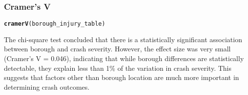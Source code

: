 \documentclass[10pt]{article}\usepackage[]{graphicx}\usepackage[]{xcolor}
\makeatletter
\newcommand{\hldef}[1]{\textcolor[rgb]{0.345,0.345,0.345}{#1}}%
\newcommand{\hlkwd}[1]{\textcolor[rgb]{0.737,0.353,0.396}{\textbf{#1}}}%
\newenvironment{kframe}{%
 \def\at@end@of@kframe{}%
 \ifinner\ifhmode%
  \def\at@end@of@kframe{\end{minipage}}%
  \begin{minipage}{\columnwidth}%
 \fi\fi%
 \def\FrameCommand##1{\hskip\@totalleftmargin \hskip-\fboxsep
 \colorbox{shadecolor}{##1}\hskip-\fboxsep
     \hskip-\linewidth \hskip-\@totalleftmargin \hskip\columnwidth}%
 \MakeFramed {\advance\hsize-\width
   \@totalleftmargin\z@ \linewidth\hsize
   \@setminipage}}%
 {\par\unskip\endMakeFramed%
 \at@end@of@kframe}
\newenvironment{knitrout}{}{} %
\makeatother
\begin{document}
\subsubsection{Cramer’s V}



\begin{knitrout}
\color{fgcolor}\begin{kframe}
\begin{alltt}
\hlkwd{cramerV}\hldef{(borough_injury_table)}
\end{alltt}


{\ttfamily\noindent\bfseries\color{errorcolor}{\#\# Error: object 'borough\_injury\_table' not found}}\end{kframe}
\end{knitrout}

The chi-square test concluded that there is a statistically significant association between borough and crash severity. However, the effect size was very small (Cramer's V = 0.046), indicating that while borough differences are statistically detectable, they explain less than 1\% of the variation in crash severity. This suggests that factors other than borough location are much more important in determining crash outcomes.
\end{document}
